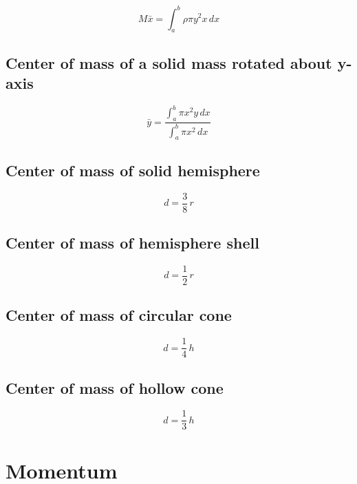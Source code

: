 \documentclass[a4paper,9pt]{scrartcl}
\begin{document}
    \begin{displaymath}
        M\bar{x} = \int_{a}^{b} \rho {\pi} y^2 x\,dx
    \end{displaymath}

    \subsection{Center of mass of a solid mass rotated about y-axis}

    \begin{displaymath}
        \bar{y} = \frac{\int_{a}^{b} {\pi} x^2 y\,dx}{\int_{a}^{b} \pi x^2 \,dx}
    \end{displaymath}

    \subsection{Center of mass of solid hemisphere}

    \begin{displaymath}
        d = \frac{3}{8}\,r
    \end{displaymath}

    \subsection{Center of mass of hemisphere shell}

    \begin{displaymath}
        d = \frac{1}{2}\,r
    \end{displaymath}

    \subsection{Center of mass of circular cone}

    \begin{displaymath}
        d = \frac{1}{4}\,h
    \end{displaymath}

    \subsection{Center of mass of hollow cone}

    \begin{displaymath}
        d = \frac{1}{3}\,h
    \end{displaymath}


    \section{Momentum}
\end{document}

